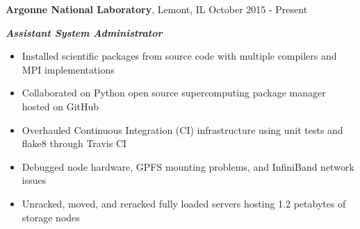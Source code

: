 
\textbf{Argonne National Laboratory}, Lemont, IL \hfill October 2015 - Present

\textbf{\textit{Assistant System Administrator}}

\begin{itemize}
    \item Installed scientific packages from source code with multiple compilers and MPI implementations
    \item Collaborated on Python open source supercomputing package manager hosted on GitHub
    \item Overhauled Continuous Integration (CI) infrastructure using unit tests and flake8 through Travis CI
    \item Debugged node hardware, GPFS mounting problems, and InfiniBand network issues
    \item Unracked, moved, and reracked fully loaded servers hosting 1.2 petabytes of storage nodes
\end{itemize}
